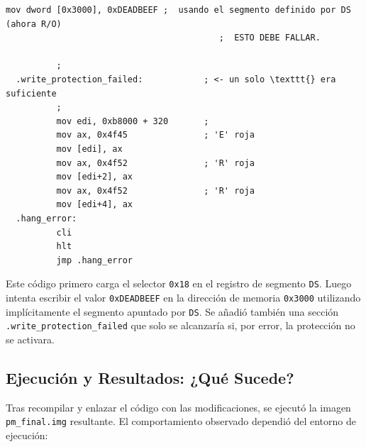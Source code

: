 \begin{enumerate}
\begin{lstlisting}[style=NasmStyle,
            caption={Intento de escritura R/O en \texttt{switch\_to\_pm.asm}}, % <-  \_
            numbers=none]
          mov dword [0x3000], 0xDEADBEEF ;  usando el segmento definido por DS (ahora R/O)
                                          ;  ESTO DEBE FALLAR.
          
          ;
  .write_protection_failed:            ; <- un solo \texttt{} era suficiente
          ; 
          mov edi, 0xb8000 + 320       ; 
          mov ax, 0x4f45               ; 'E' roja
          mov [edi], ax
          mov ax, 0x4f52               ; 'R' roja
          mov [edi+2], ax
          mov ax, 0x4f52               ; 'R' roja
          mov [edi+4], ax
  .hang_error:
          cli
          hlt
          jmp .hang_error
          \end{lstlisting}
  
          Este código primero carga el selector \texttt{0x18} en el registro de segmento \texttt{DS}.
          Luego intenta escribir el valor \texttt{0xDEADBEEF} en la dirección de memoria \texttt{0x3000}
          utilizando implícitamente el segmento apuntado por \texttt{DS}.  
          Se añadió también una sección \texttt{.write\_protection\_failed} que solo se alcanzaría si,
          por error, la protección no se activara.
  \end{enumerate}
  



\subsection{Ejecución y Resultados: ¿Qué Sucede?}

Tras recompilar y enlazar el código con las modificaciones, se ejecutó la imagen \texttt{pm\_final.img} resultante. El comportamiento observado dependió del entorno de ejecución:

